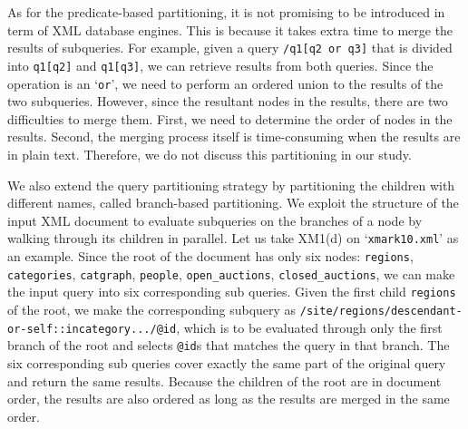 
As for the predicate-based partitioning, it is not promising to be introduced in
term of XML database engines. This is because it takes extra time to
merge the results of subqueries. For example, given a query \texttt{/q1[q2 or
	q3]} that is divided into \texttt{q1[q2]} and \texttt{q1[q3]}, we can retrieve
results from both queries. Since the operation is an `\texttt{or}', we need to
perform an ordered union to the results of the two subqueries. However, since
the resultant nodes in the results, there are two difficulties to merge them.
First, we need to determine the order of nodes in the results. Second, the
merging process itself is time-consuming when the results are in plain text.
Therefore, we do not discuss this partitioning in our study.

We also extend the query partitioning strategy by partitioning the children with
different names, called branch-based partitioning. We exploit the structure of the
input XML document to evaluate subqueries on the branches of a node by walking
through its children in parallel. Let us take XM1(d) on `\texttt{xmark10.xml}'
as an example. Since the root of the document has only six nodes:
\texttt{regions}, 
\texttt{categories}, 
\texttt{catgraph}, 
\texttt{people},
\texttt{open\_auctions},
\texttt{closed\_auctions}, 
we can make the input query into six corresponding sub
queries. Given the first child \texttt{regions} of the root, we make the
corresponding subquery as
\verb|/site/regions/descendant-or-self::incategory.../@id|, which is to be
evaluated through only the first branch of the root  and selects \texttt{@id}s
that matches the query in that branch. 
The six corresponding sub queries cover exactly the same part of the
original query and return the same results. Because the children of the root are
in document order, the results are also ordered as long as the results are
merged in the same order.


